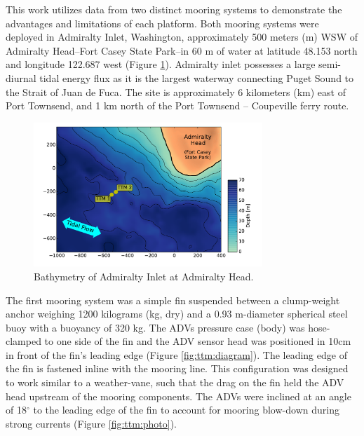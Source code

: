 \documentclass[twocol]{ametsoc}
\begin{document}
This work utilizes data from two distinct mooring systems to demonstrate the advantages and limitations of each platform. Both mooring systems were deployed in Admiralty Inlet, Washington, approximately 500 meters (m) WSW of Admiralty Head--Fort Casey State Park--in 60 m of water at latitude 48.153 north and longitude 122.687 west (Figure \ref{fig:map}). Admiralty inlet possesses a large semi-diurnal tidal energy flux as it is the largest waterway connecting Puget Sound to the Strait of Juan de Fuca. The site is approximately 6 kilometers (km) east of Port Townsend, and 1 km north of the Port Townsend -- Coupeville ferry route.

\begin{figure}[t]
  \centering
  \includegraphics[width=3.4in]{map02}
  \caption{Bathymetry of Admiralty Inlet at Admiralty Head.}
  \label{fig:map}
\end{figure}

The first mooring system was a simple fin suspended between a clump-weight anchor weighing 1200 kilograms (kg, dry) and a 0.93 m-diameter spherical steel buoy with a buoyancy of 320 kg. The ADVs pressure case (body) was hose-clamped to one side of the fin and the ADV sensor head was positioned in 10cm in front of the fin's leading edge (Figure \ref{fig:ttm:diagram}). The leading edge of the fin is fastened inline with the mooring line. This configuration  was designed to work similar to a weather-vane, such that the drag on the fin held the ADV head upstream of the mooring components. The ADVs were inclined at an angle of 18$^\circ$ to the leading edge of the fin to account for mooring blow-down during strong currents (Figure \ref{fig:ttm:photo}).
\end{document}
